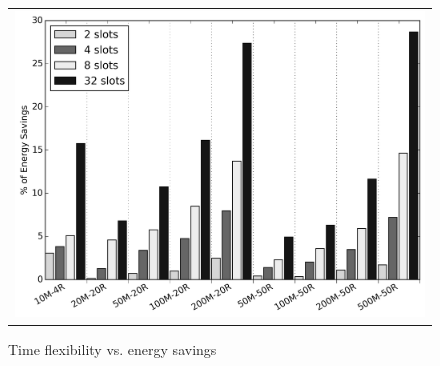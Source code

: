 \begin{figure}[h]
\centering
\begin{tabular}{c}
  \includegraphics[width=0.8\linewidth]{figs/energy_tf_def_mtd_perc.png} 
\end{tabular}
\caption{Time flexibility vs. energy savings}
\label{fig:online_tf}
\end{figure}

